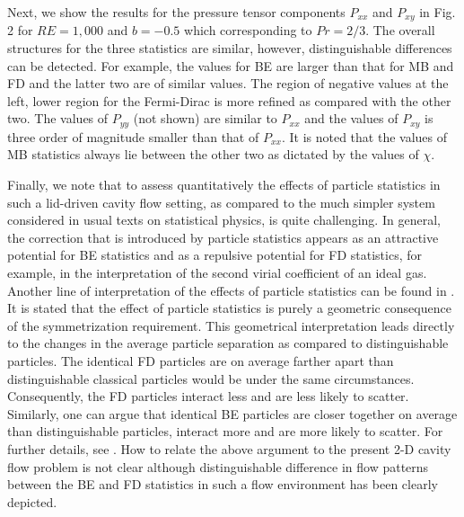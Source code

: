 \documentclass[doublecol]{epl2}
\begin{document}
Next, we show the results for the pressure tensor components $P_{xx}$ and $P_{xy}$ in Fig. 2 for $RE=1,000$ and $b=-0.5$ which corresponding to $Pr=2/3$.  The overall structures for the three statistics are similar, however, distinguishable differences can be detected.  For example, the values for BE are larger than that for MB and FD and the latter two are of similar values.  The region of negative values at the left, lower region for the Fermi-Dirac is more refined as compared with the other two.  The values of $P_{yy}$ (not shown) are similar to $P_{xx}$ and the values of $P_{xy}$ is three order of magnitude smaller than that of $P_{xx}$.  It is noted that the values of MB statistics always lie between the other two as dictated by the values of $\chi$.

Finally, we note that to assess quantitatively the effects of particle statistics in such a lid-driven cavity flow setting, as compared to the much simpler system considered in usual texts on statistical physics, is quite challenging. In general, the correction that is introduced by particle statistics appears as an attractive potential for BE statistics and as a repulsive potential for FD statistics, for example, in the interpretation of the second virial coefficient of an ideal gas. Another line of interpretation of the effects of particle statistics can be found in \cite{Mullin2003}.
It is stated that the effect of particle statistics is purely a geometric consequence of the symmetrization requirement. This geometrical interpretation leads directly to the changes in the average particle separation as compared to distinguishable particles. The identical FD particles are on average farther apart than distinguishable classical particles would be under the same circumstances. Consequently, the FD particles interact less and are less likely to scatter. Similarly, one can argue that identical BE particles are closer together on average than distinguishable particles, interact more and are more likely to scatter. For further details, see \cite{Mullin2003}. How to relate the above argument to the present 2-D cavity flow problem is not clear although distinguishable difference in flow patterns between the BE and FD statistics in such a flow environment has been clearly depicted.
\end{document}
